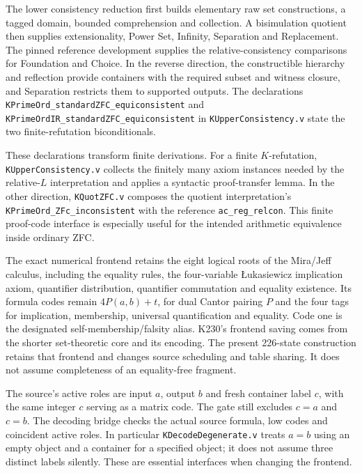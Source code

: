 The lower consistency reduction first builds elementary raw set
constructions, a tagged domain, bounded comprehension and collection.
A bisimulation quotient then supplies extensionality, Power Set,
Infinity, Separation and Replacement.  The pinned reference
development supplies the relative-consistency comparisons for
Foundation and Choice.  In the reverse direction, the constructible
hierarchy and reflection provide containers with the required subset
and witness closure, and Separation restricts them to supported
outputs.  The declarations
\texttt{KPrimeOrd\_standardZFC\_equiconsistent} and
\texttt{KPrimeOrdIR\_standardZFC\_equiconsistent} in
\texttt{KUpperConsistency.v} state the two finite-refutation
biconditionals.

These declarations transform finite derivations.  For a finite
$K$-refutation, \texttt{KUpperConsistency.v} collects the finitely many
axiom instances needed by the relative-$L$ interpretation and applies
a syntactic proof-transfer lemma.  In the other direction,
\texttt{KQuotZFC.v} composes the quotient interpretation's
\texttt{KPrimeOrd\_ZFc\_inconsistent} with the reference
\texttt{ac\_reg\_relcon}.  This finite proof-code interface is especially
useful for the intended arithmetic equivalence inside ordinary ZFC.

The exact numerical frontend retains the eight logical roots of the
Mira/Jeff calculus, including the equality rules, the four-variable
\L{}ukasiewicz implication axiom, quantifier distribution, quantifier
commutation and equality existence.  Its formula codes remain
$4P(a,b)+t$, for dual Cantor pairing $P$ and the four tags for
implication, membership, universal quantification and equality.
Code one is the designated self-membership/falsity alias.  K230's
frontend saving comes from the shorter set-theoretic core and its
encoding. The present 226-state construction retains that frontend and
changes source scheduling and table sharing. It does not assume
completeness of an equality-free fragment.

The source's active roles are input $a$, output $b$ and fresh
container label $c$, with the same integer $c$ serving as a matrix
code.  The gate still excludes $c=a$ and $c=b$.  The decoding bridge
checks the actual source formula, low codes and coincident active
roles.  In particular \texttt{KDecodeDegenerate.v} treats $a=b$
using an empty object and a container for a specified object; it
does not assume three distinct labels silently.  These are essential
interfaces when changing the frontend.

